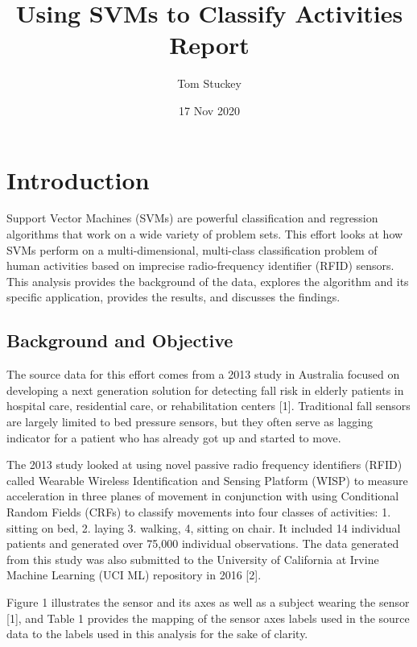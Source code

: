 \documentclass[
]{article}
\title{Using SVMs to Classify Activities\\
Report}
\author{Tom Stuckey}
\date{17 Nov 2020}
\begin{document}
\maketitle

\section{Introduction}\label{introduction}

Support Vector Machines (SVMs) are powerful classification and
regression algorithms that work on a wide variety of problem sets. This
effort looks at how SVMs perform on a multi-dimensional, multi-class
classification problem of human activities based on imprecise
radio-frequency identifier (RFID) sensors. This analysis provides the
background of the data, explores the algorithm and its specific
application, provides the results, and discusses the findings.

\subsection{Background and Objective}\label{background-and-objective}

The source data for this effort comes from a 2013 study in Australia
focused on developing a next generation solution for detecting fall risk
in elderly patients in hospital care, residential care, or
rehabilitation centers {[}1{]}. Traditional fall sensors are largely
limited to bed pressure sensors, but they often serve as lagging
indicator for a patient who has already got up and started to move.

The 2013 study looked at using novel passive radio frequency identifiers
(RFID) called Wearable Wireless Identification and Sensing Platform
(WISP) to measure acceleration in three planes of movement in
conjunction with using Conditional Random Fields (CRFs) to classify
movements into four classes of activities: 1. sitting on bed, 2. laying
3. walking, 4, sitting on chair. It included 14 individual patients and
generated over 75,000 individual observations. The data generated from
this study was also submitted to the University of California at Irvine
Machine Learning (UCI ML) repository in 2016 {[}2{]}.

Figure 1 illustrates the sensor and its axes as well as a subject
wearing the sensor {[}1{]}, and Table 1 provides the mapping of the
sensor axes labels used in the source data to the labels used in this
analysis for the sake of clarity.
\end{document}
